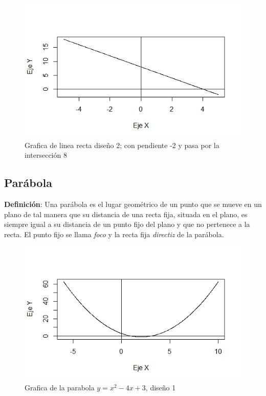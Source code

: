 \documentclass[12pt,a4paper]{article} %
\begin{document}
\begin{figure}
\centering
\includegraphics[scale=0.75]{Recta3.png}
\caption{Grafica de linea recta diseño 2; con pendiente -2 y pasa por la intersección 8}
\end{figure}

\newpage
\subsection{Parábola} \label{subsec:parabola}

\textbf{Definici\'{o}n}: Una parábola es el lugar geométrico de un punto que se mueve en un plano de tal manera que su distancia de una recta fija, situada en el plano, es siempre igual a su distancia de un punto fijo del plano y que no pertenece a la recta. El punto fijo se llama \textit{foco} y la recta fija \textit{directiz} de la parábola.

\begin{figure}
\centering
\includegraphics[scale=0.75]{Parabola2.png}
\caption{Grafica de la parabola $y=x^2-4x+3$, diseño 1}
\end{figure}
\end{document}
